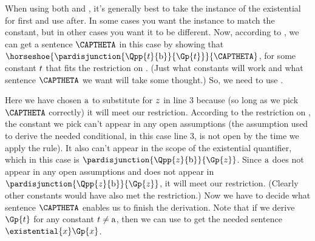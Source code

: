 When using both  and , it’s generally best to take the instance of the existential for  first and use  after. In some cases
you want the  instance to match the  constant, but in other cases you want it to be different.
Now, according to , we can get a sentence $\CAPTHETA$ in this case by showing that $\horseshoe{\pardisjunction{\Qpp{\variable{t}}{\constant{b}}}{\Gp{\variable{t}}}}{\CAPTHETA}$, for some constant $t$ that fits the restriction on .
(Just what constants will work and what sentence $\CAPTHETA$ we want will take some thought.)
So, we need to use . 
\begin{gproof}[\label{GQDExampleI}]
\end{gproof}
Here we have chosen $\mathrm{a}$ to substitute for $z$ in line 3 because (so long as we pick $\CAPTHETA$ correctly) it will meet our restriction. 
According to the restriction on , the constant we pick can't appear in any open assumptions (the assumption used to derive the needed conditional, in this case line 3, is not open by the time we apply the rule). 
It also can't appear in the scope of the existential quantifier, which in this case is $\pardisjunction{\Qpp{\variable{z}}{\constant{b}}}{\Gp{\variable{z}}}$. 
Since $\mathrm{a}$ does not appear in any open assumptions and does not appear in $\pardisjunction{\Qpp{\variable{z}}{\constant{b}}}{\Gp{\variable{z}}}$, it will meet our restriction.
(Clearly other constants would have also met the restriction.)
Now we have to decide what sentence $\CAPTHETA$ enables us to finish the derivation. 
Note that if we derive $\Gp{\variable{t}}$ for any constant $t\neq\mathrm{a}$, then we can use  to get the needed sentence $\existential{\variable{x}}\Gp{\variable{x}}$. 
